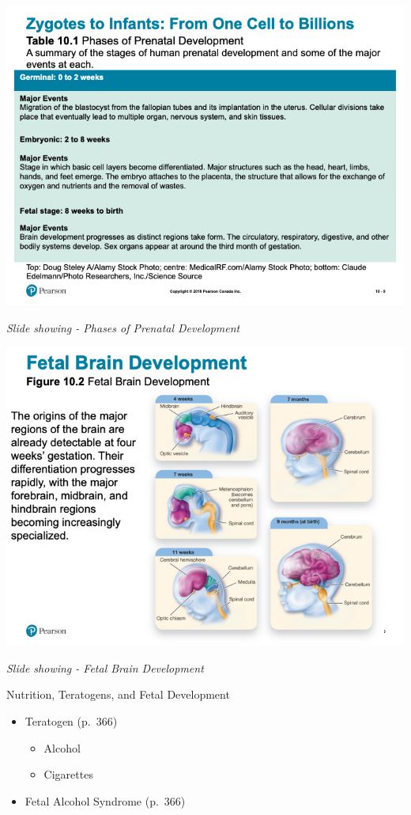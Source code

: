 \documentclass[
]{book}
\providecommand{\tightlist}{%
  \setlength{\itemsep}{0pt}\setlength{\parskip}{0pt}}
\begin{document}
\begin{reflect}
\includegraphics{assets/unit_3/slide_9.png}

\emph{Slide showing - Phases of Prenatal Development}

\includegraphics{assets/unit_3/slide_10.png}

\emph{Slide showing - Fetal Brain Development}

Nutrition, Teratogens, and Fetal Development

\begin{itemize}
\tightlist
\item
  Teratogen (p.~366)

  \begin{itemize}
  \tightlist
  \item
    Alcohol\\
  \item
    Cigarettes\\
  \end{itemize}
\item
  Fetal Alcohol Syndrome (p.~366)


\end{itemize}
\end{reflect}
\end{document}
